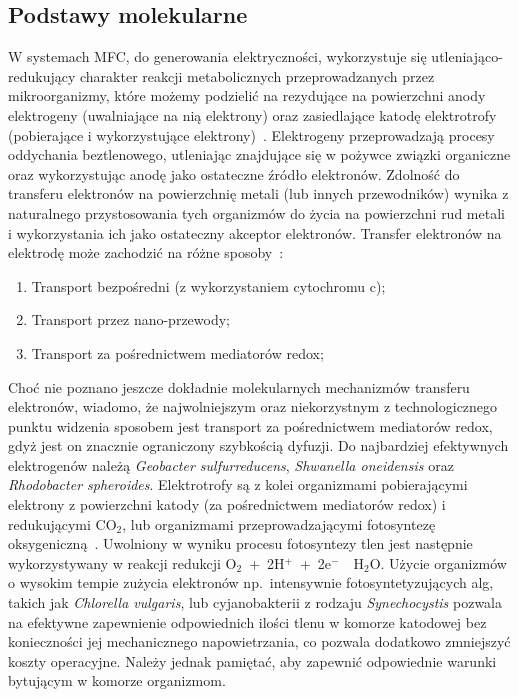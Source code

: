 \subsection{Podstawy molekularne}\label{subsec:podstawy-molekularne}
W systemach MFC, do generowania elektryczności, wykorzystuje się
utleniająco-redukujący charakter reakcji metabolicznych
przeprowadzanych przez mikroorganizmy, które możemy podzielić
na rezydujące na powierzchni anody elektrogeny (uwalniające na nią
elektrony) oraz zasiedlające katodę elektrotrofy
(pobierające i wykorzystujące elektrony)~\cite{AlSayed2020}.
Elektrogeny przeprowadzają procesy oddychania beztlenowego,
utleniając znajdujące się w pożywce związki organiczne oraz
wykorzystując anodę jako ostateczne źródło elektronów.
Zdolność do transferu elektronów na powierzchnię metali (lub
innych przewodników) wynika z naturalnego przystosowania tych
organizmów do życia na powierzchni rud metali i wykorzystania
ich jako ostateczny akceptor elektronów.
Transfer elektronów na elektrodę może zachodzić na różne
sposoby~\cite{Santoro2017}:

\begin{enumerate}
    \item Transport bezpośredni (z wykorzystaniem cytochromu c);
    \item Transport przez nano-przewody;
    \item Transport za pośrednictwem mediatorów redox;
\end{enumerate}

Choć nie poznano jeszcze dokładnie molekularnych mechanizmów
transferu elektronów, wiadomo, że najwolniejszym oraz
niekorzystnym z technologicznego punktu widzenia sposobem jest
transport za pośrednictwem mediatorów redox, gdyż jest on znacznie
ograniczony szybkością dyfuzji.
Do najbardziej efektywnych elektrogenów należą
\textit{Geobacter sulfurreducens}, \textit{Shwanella oneidensis}
oraz \textit{Rhodobacter spheroides}.
Elektrotrofy są z kolei organizmami pobierającymi elektrony
z powierzchni katody (za pośrednictwem mediatorów redox)
i redukującymi CO$_2$, lub organizmami przeprowadzającymi fotosyntezę
oksygeniczną~\cite{Santoro2017, Reddy2019}.
Uwolniony w wyniku procesu fotosyntezy tlen jest następnie
wykorzystywany w reakcji redukcji
O$_2$~+~2H$^+$~+~2e$^-$~\textrightarrow~H$_2$O\@.
Użycie organizmów o wysokim tempie zużycia elektronów np.\ intensywnie
fotosyntetyzujących alg, takich jak \textit{Chlorella vulgaris},
lub cyjanobakterii z rodzaju \textit{Synechocystis} pozwala na efektywne
zapewnienie odpowiednich ilości tlenu w komorze katodowej bez
konieczności jej mechanicznego napowietrzania, co pozwala dodatkowo
zmniejszyć koszty operacyjne.
Należy jednak pamiętać, aby zapewnić odpowiednie warunki
bytującym w komorze organizmom.
